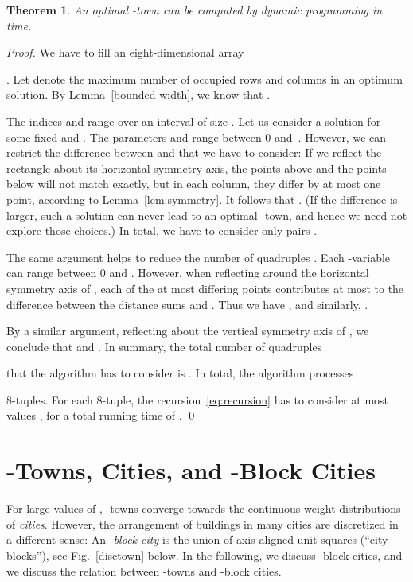 \documentclass[preprint,authoryear,12pt]{elsarticle}
\newtheorem{theorem}{Theorem}
\begin{document}
\begin{theorem}
\label{running}
An optimal -town can be computed by dynamic programming in
 time.
\end{theorem}
\begin{proof}
  We have to fill an eight-dimensional array
  
  .  Let
   denote the maximum number of occupied rows and columns in
  an optimum solution.  By Lemma~\ref{bounded-width}, we know that
  .

  The indices  and  range over an interval of size
  . Let us consider a solution for some fixed 
  and .  The parameters  and  range between 0 and~.  However,
  we can restrict the difference between  and  that we have to
  consider: If we reflect the rectangle
  about its horizontal
  symmetry axis, the  points above  and the  points below 
  will not match exactly, but in each column, they differ by at most
  one point, according to Lemma~\ref{lem:symmetry}. It follows that .  (If the difference is larger, such a
  solution can never lead to an optimal -town, and hence we need
  not explore those choices.)  In total, we have to consider
  only  pairs .

  The same argument helps to reduce the number of quadruples
   .
  Each -variable
  can range between 0 and .
  However, when reflecting around the horizontal symmetry axis of , each of the
at most  differing points contributes at most  to the difference between the distance sums
   and . Thus we have
  , and similarly,
  .

By a similar argument, reflecting about
 the vertical symmetry axis of , we conclude that
   and
. In summary, the
total number of quadruples
  
that the algorithm has to consider is . In total, the algorithm processes

8-tuples. For each 8-tuple, the recursion~\eqref{eq:recursion} has
to consider at most  values , for a
total running time of .  \qed
\end{proof}

\section{\boldmath -Towns, Cities, and -Block Cities}\label{sec:townscitiesblockcities}
 For large values of ,
 -towns converge
towards the continuous weight distributions of {\em cities}.
However, the arrangement of buildings in many cities are discretized
in a different sense: An {\em{-block city}} is the
union of  axis-aligned unit squares (``city blocks''),
see Fig.~\ref{disctown} below. In the following,
we discuss -block cities, and
we discuss the relation between -towns and -block
cities.
\end{document}
